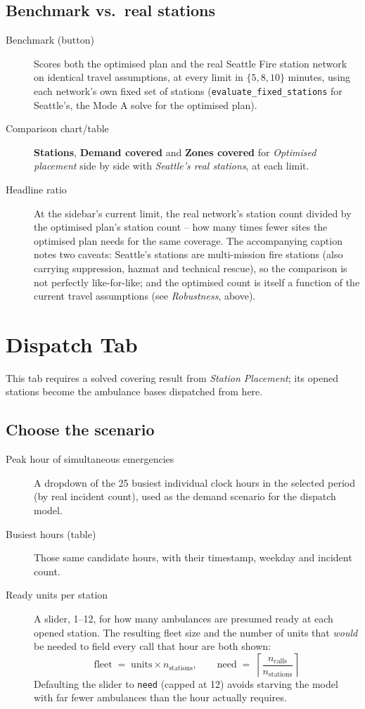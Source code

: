 \documentclass[11pt]{article}
\begin{document}
\subsection{Benchmark vs.\ real stations}
\begin{description}
  \item[Benchmark (button)] Scores both the optimised plan and the real
    Seattle Fire station network on identical travel assumptions, at every
    limit in $\{5, 8, 10\}$ minutes, using each network's own fixed set of
    stations (\texttt{evaluate\_fixed\_stations} for Seattle's, the Mode A
    solve for the optimised plan).
  \item[Comparison chart/table] \textbf{Stations}, \textbf{Demand covered} and
    \textbf{Zones covered} for \emph{Optimised placement} side by side with
    \emph{Seattle's real stations}, at each limit.
  \item[Headline ratio] At the sidebar's current limit, the real network's
    station count divided by the optimised plan's station count -- how many
    times fewer sites the optimised plan needs for the same coverage. The
    accompanying caption notes two caveats: Seattle's stations are
    multi-mission fire stations (also carrying suppression, hazmat and
    technical rescue), so the comparison is not perfectly like-for-like; and
    the optimised count is itself a function of the current travel
    assumptions (see \emph{Robustness}, above).
\end{description}

\section{Dispatch Tab}
This tab requires a solved covering result from \emph{Station Placement};
its opened stations become the ambulance bases dispatched from here.

\subsection{Choose the scenario}
\begin{description}
  \item[Peak hour of simultaneous emergencies] A dropdown of the 25 busiest
    individual clock hours in the selected period (by real incident count),
    used as the demand scenario for the dispatch model.
  \item[Busiest hours (table)] Those same candidate hours, with their
    timestamp, weekday and incident count.
  \item[Ready units per station] A slider, 1--12, for how many ambulances are
    presumed ready at each opened station. The resulting fleet size and the
    number of units that \emph{would} be needed to field every call that hour
    are both shown:
    \[
      \text{fleet} \;=\; \text{units}\times n_{\text{stations}}, \qquad
      \text{need} \;=\; \left\lceil \frac{n_{\text{calls}}}{n_{\text{stations}}} \right\rceil
    \]
    Defaulting the slider to \texttt{need} (capped at 12) avoids starving the
    model with far fewer ambulances than the hour actually requires.
\end{description}
\end{document}
